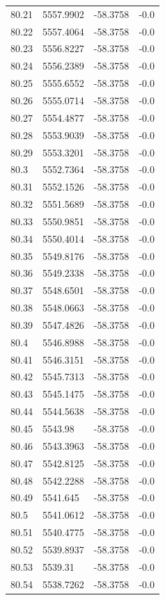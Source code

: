 \begin{table}[H]
\begin{tabular}{llll}
80.21 & 5557.9902 & -58.3758 & -0.0 \\
80.22 & 5557.4064 & -58.3758 & -0.0 \\
80.23 & 5556.8227 & -58.3758 & -0.0 \\
80.24 & 5556.2389 & -58.3758 & -0.0 \\
80.25 & 5555.6552 & -58.3758 & -0.0 \\
80.26 & 5555.0714 & -58.3758 & -0.0 \\
80.27 & 5554.4877 & -58.3758 & -0.0 \\
80.28 & 5553.9039 & -58.3758 & -0.0 \\
80.29 & 5553.3201 & -58.3758 & -0.0 \\
80.3 & 5552.7364 & -58.3758 & -0.0 \\
80.31 & 5552.1526 & -58.3758 & -0.0 \\
80.32 & 5551.5689 & -58.3758 & -0.0 \\
80.33 & 5550.9851 & -58.3758 & -0.0 \\
80.34 & 5550.4014 & -58.3758 & -0.0 \\
80.35 & 5549.8176 & -58.3758 & -0.0 \\
80.36 & 5549.2338 & -58.3758 & -0.0 \\
80.37 & 5548.6501 & -58.3758 & -0.0 \\
80.38 & 5548.0663 & -58.3758 & -0.0 \\
80.39 & 5547.4826 & -58.3758 & -0.0 \\
80.4 & 5546.8988 & -58.3758 & -0.0 \\
80.41 & 5546.3151 & -58.3758 & -0.0 \\
80.42 & 5545.7313 & -58.3758 & -0.0 \\
80.43 & 5545.1475 & -58.3758 & -0.0 \\
80.44 & 5544.5638 & -58.3758 & -0.0 \\
80.45 & 5543.98 & -58.3758 & -0.0 \\
80.46 & 5543.3963 & -58.3758 & -0.0 \\
80.47 & 5542.8125 & -58.3758 & -0.0 \\
80.48 & 5542.2288 & -58.3758 & -0.0 \\
80.49 & 5541.645 & -58.3758 & -0.0 \\
80.5 & 5541.0612 & -58.3758 & -0.0 \\
80.51 & 5540.4775 & -58.3758 & -0.0 \\
80.52 & 5539.8937 & -58.3758 & -0.0 \\
80.53 & 5539.31 & -58.3758 & -0.0 \\
80.54 & 5538.7262 & -58.3758 & -0.0 \\

\end{tabular}
\end{table}

